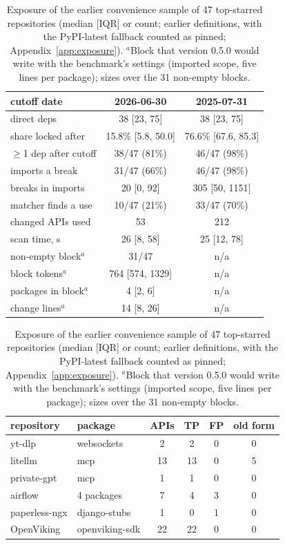 \documentclass[11pt]{article}
\begin{document}
\begin{table}[t]
\begin{minipage}[t]{0.47\textwidth}
\centering
\footnotesize
\setlength{\tabcolsep}{2pt}
\begin{tabular}{lcc}
\toprule
cutoff date & 2026-06-30 & 2025-07-31 \\
\midrule
direct deps & 38 [23, 75] & 38 [23, 75] \\
share locked after & 15.8\% [5.8, 50.0] & 76.6\% [67.6, 85.3] \\
$\geq$1 dep after cutoff & 38/47 (81\%) & 46/47 (98\%) \\
imports a break & 31/47 (66\%) & 46/47 (98\%) \\
breaks in imports & 20 [0, 92] & 305 [50, 1151] \\
matcher finds a use & 10/47 (21\%) & 33/47 (70\%) \\
changed APIs used & 53 & 212 \\
scan time, s & 26 [8, 58] & 25 [12, 78] \\
non-empty block$^{a}$ & 31/47 & n/a \\
block tokens$^{a}$ & 764 [574, 1329] & n/a \\
packages in block$^{a}$ & 4 [2, 6] & n/a \\
change lines$^{a}$ & 14 [8, 26] & n/a \\
\bottomrule
\end{tabular}
\caption{Exposure of the earlier convenience sample of 47 top-starred repositories (median [IQR] or count; earlier definitions, with the PyPI-latest fallback counted as pinned; Appendix~\ref{app:exposure}). $^{a}$Block that version 0.5.0 would write with the benchmark's settings (imported scope, five lines per package); sizes over the 31 non-empty blocks.}
\label{tab:exposure}
\end{minipage}\hfill
\begin{minipage}[t]{0.47\textwidth}
\centering
\footnotesize
\setlength{\tabcolsep}{2.5pt}
\begin{tabular}{llcccc}
\toprule
repository & package & APIs & TP & FP & old form \\
\midrule
yt-dlp & websockets & 2 & 2 & 0 & 0 \\
litellm & mcp & 13 & 13 & 0 & 5 \\
private-gpt & mcp & 1 & 1 & 0 & 0 \\
airflow & 4 packages & 7 & 4 & 3 & 0 \\
paperless-ngx & django-stubs & 1 & 0 & 1 & 0 \\
OpenViking & openviking-sdk & 22 & 22 & 0 & 0 \\

\end{tabular}
\end{minipage}
\end{table}
\end{document}
